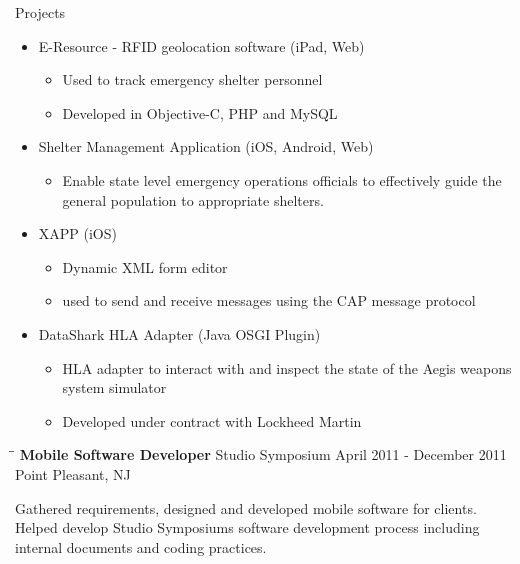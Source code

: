 \documentclass{res}
\begin{document}
\begin{resume}
    Projects
    \begin{itemize}
        \item E-Resource - RFID geolocation software (iPad, Web)
        \begin{itemize}
            \item Used to track emergency shelter personnel
            \item Developed in Objective-C, PHP and MySQL
        \end{itemize}
        \item Shelter Management Application (iOS, Android, Web)
        \begin{itemize}
            \item Enable state level emergency operations officials to effectively guide the general population to appropriate shelters.
        \end{itemize}
        \item XAPP (iOS)
        \begin{itemize}
            \item Dynamic XML form editor
            \item used to send and receive messages using the CAP message protocol
        \end{itemize}
        \item DataShark HLA Adapter (Java OSGI Plugin)
        \begin{itemize}
            \item HLA adapter to interact with and inspect the state of the Aegis weapons system simulator
            \item Developed under contract with Lockheed Martin
        \end{itemize}
    \end{itemize}

\newpage
   \begin{tabbing}
   \hspace{2.3in}\= \hspace{2.6in}\= \kill %
    {\bf Mobile Software Developer} \>Studio Symposium     \>April 2011 - December 2011\\
                             \>Point Pleasant, NJ
   \end{tabbing}\vspace{-20pt}      %
   Gathered requirements, designed and developed mobile software for clients. Helped develop Studio Symposiums software development process including internal documents and coding practices.


\end{resume}
\end{document}
